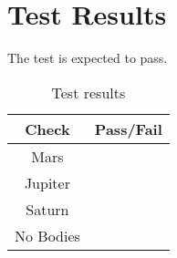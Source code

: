 \section{Test Results}
The test is expected to pass.
\begin{table}[H]
	\caption{Test results}
	\label{tab:results}
	\centering \fontsize{10}{10}\selectfont
	\begin{tabular}{c | c  } %
		\hline\hline
		\textbf{Check} 	&\textbf{Pass/Fail} \\ 
		\hline
	   Mars	   			&  \\ 
	   Jupiter	   			&  \\ 
	   Saturn	   			&  \\ 
	   No Bodies			&  \\
	   \hline\hline
	\end{tabular}
\end{table}




